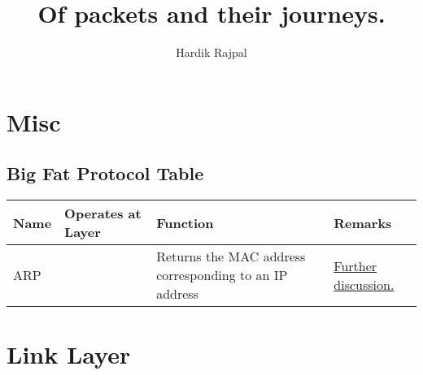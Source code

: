 \documentclass{report}
\author{Hardik Rajpal}
\title{Of packets and their journeys.}
\newcommand{\protorow}[4]{#1 & #2 & #3 & #4 \\ \hline}
\begin{document}
\maketitle
\tableofcontents
\chapter{Misc}
\section{Big Fat Protocol Table}
\begin{center}
\begin{tabular}{| p{3cm} | p{3cm} | p{4cm} | p{4cm} | }
\hline
\protorow{Name}{Operates at Layer}{Function}{Remarks}
\protorow{ARP}{}{Returns the MAC address corresponding to an IP address}{\hyperref[sec:arp]{Further discussion.}}
\end{tabular}
\end{center}
\chapter{Link Layer}
\end{document}

